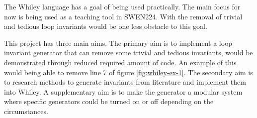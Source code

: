 \documentclass[11pt, a4paper, twoside, openright]{report}
\begin{document}

The Whiley language has a goal of being used practically.
The main focus for now is being used as a teaching tool in SWEN224.
With the removal of trivial and tedious loop invariants would be one 
less obstacle to this goal.


This project has three main aims.
The primary aim is to implement a loop invariant generator that can remove
some trivial and tedious invariants, would be demonstrated through reduced required
amount of code. An example of this would being able to remove line 7 of figure \ref{fig:whiley-ex-1}.
The secondary aim is to research methods to generate invariants from literature 
and implement them into Whiley.
A supplementary aim is to make the generator a modular system where specific generators
could be turned on or off depending on the circumstances.

%
%
%
%
\end{document}

